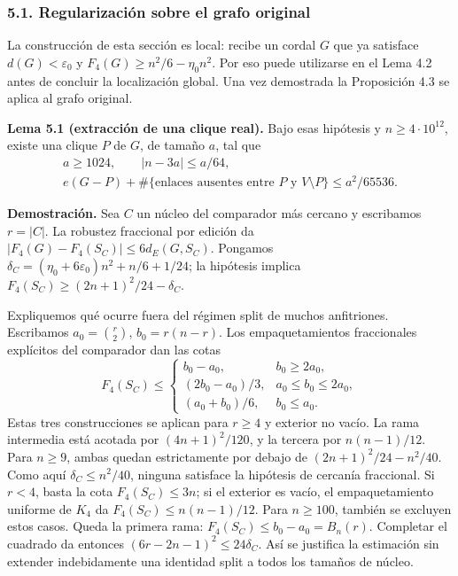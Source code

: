 \documentclass[spanish,11pt,a4paper]{article}
\begin{document}
\subsubsection{5.1. Regularización sobre el grafo original}\label{regularizacion-sobre-el-grafo-original}

La construcción de esta sección es local: recibe un cordal \(G\) que ya satisface \(d(G)<\varepsilon_0\) y \(F_4(G)\ge n^2/6-\eta_0n^2\). Por eso puede utilizarse en el Lema 4.2 antes de concluir la localización global. Una vez demostrada la Proposición 4.3 se aplica al grafo original.


\textbf{Lema 5.1 (extracción de una clique real).} Bajo esas hipótesis y \(n\ge4\cdot10^{12}\), existe una clique \(P\) de \(G\), de tamaño \(a\), tal que \[
\begin{gathered}
a\ge1024,\qquad |n-3a|\le a/64,\\
e(G-P)+\#\{\text{enlaces ausentes entre }P\text{ y }V\setminus P\}
\le a^2/65536.
\end{gathered}
\tag{5.1}
\]

\textbf{Demostración.} Sea \(C\) un núcleo del comparador más cercano y escribamos \(r=|C|\). La robustez fraccional por edición da \(|F_4(G)-F_4(S_C)|\le6d_E(G,S_C)\). Pongamos \(\delta_C=(\eta_0+6\varepsilon_0)n^2+n/6+1/24\); la hipótesis implica \(F_4(S_C)\ge(2n+1)^2/24-\delta_C\).

Expliquemos qué ocurre fuera del régimen split de muchos anfitriones. Escribamos \(a_0=\binom r2\), \(b_0=r(n-r)\). Los empaquetamientos fraccionales explícitos del comparador dan las cotas \[
F_4(S_C)\le
\begin{cases}
b_0-a_0,&b_0\ge2a_0,\\
(2b_0-a_0)/3,&a_0\le b_0\le2a_0,\\
(a_0+b_0)/6,&b_0\le a_0.
\end{cases}
\tag{5.1a}
\] Estas tres construcciones se aplican para \(r\ge4\) y exterior no vacío. La rama intermedia está acotada por \((4n+1)^2/120\), y la tercera por \(n(n-1)/12\). Para \(n\ge9\), ambas quedan estrictamente por debajo de \((2n+1)^2/24-n^2/40\). Como aquí \(\delta_C\le n^2/40\), ninguna satisface la hipótesis de cercanía fraccional. Si \(r<4\), basta la cota \(F_4(S_C)\le3n\); si el exterior es vacío, el empaquetamiento uniforme de \(K_4\) da \(F_4(S_C)\le n(n-1)/12\). Para \(n\ge100\), también se excluyen estos casos. Queda la primera rama: \(F_4(S_C)\le b_0-a_0=B_n(r)\). Completar el cuadrado da entonces \((6r-2n-1)^2\le24\delta_C\). Así se justifica la estimación sin extender indebidamente una identidad split a todos los tamaños de núcleo.
\end{document}
